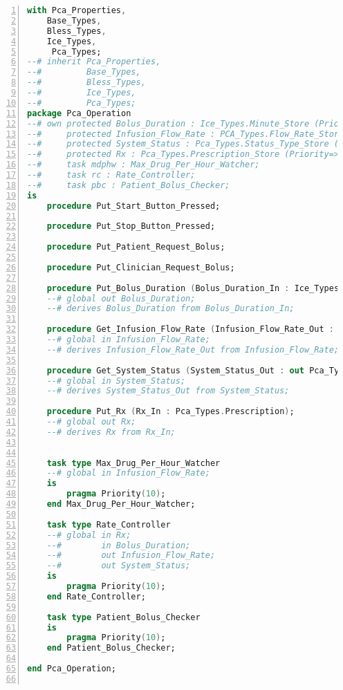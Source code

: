 \newpage

\singlespacing
\begin{lstlisting}[language=ada, gobble=0, numbers=left, caption={\lstinline{Pca_Operation} package}]
with Pca_Properties,
    Base_Types,
    Bless_Types,
    Ice_Types,
     Pca_Types;
--# inherit Pca_Properties,
--#         Base_Types,
--#         Bless_Types,
--#         Ice_Types,
--#         Pca_Types;
package Pca_Operation
--# own protected Bolus_Duration : Ice_Types.Minute_Store (Priority=>10);
--#     protected Infusion_Flow_Rate : PCA_Types.Flow_Rate_Store (Priority=>10);
--#     protected System_Status : Pca_Types.Status_Type_Store (Priority=>10);
--#     protected Rx : Pca_Types.Prescription_Store (Priority=>10);
--#     task mdphw : Max_Drug_Per_Hour_Watcher;
--#     task rc : Rate_Controller;
--#     task pbc : Patient_Bolus_Checker;
is
    procedure Put_Start_Button_Pressed;

    procedure Put_Stop_Button_Pressed;

    procedure Put_Patient_Request_Bolus;

    procedure Put_Clinician_Request_Bolus;

    procedure Put_Bolus_Duration (Bolus_Duration_In : Ice_Types.Minute);
    --# global out Bolus_Duration;
    --# derives Bolus_Duration from Bolus_Duration_In;

    procedure Get_Infusion_Flow_Rate (Infusion_Flow_Rate_Out : out Pca_Types.Flow_Rate);
    --# global in Infusion_Flow_Rate;
    --# derives Infusion_Flow_Rate_Out from Infusion_Flow_Rate;

    procedure Get_System_Status (System_Status_Out : out Pca_Types.Status_Type);
    --# global in System_Status;
    --# derives System_Status_Out from System_Status;

    procedure Put_Rx (Rx_In : Pca_Types.Prescription);
    --# global out Rx;
    --# derives Rx from Rx_In;


    task type Max_Drug_Per_Hour_Watcher
    --# global in Infusion_Flow_Rate;
    is
        pragma Priority(10);
    end Max_Drug_Per_Hour_Watcher;

    task type Rate_Controller
    --# global in Rx;
    --#        in Bolus_Duration;
    --#        out Infusion_Flow_Rate;
    --#        out System_Status;
    is
        pragma Priority(10);
    end Rate_Controller;

    task type Patient_Bolus_Checker
    is
        pragma Priority(10);
    end Patient_Bolus_Checker;

end Pca_Operation;


\end{lstlisting}

